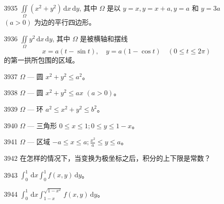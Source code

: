 \begin{prob}[M]{3935}
$\iint\limits_{\Omega} (x^2 + y^2)\,\mathrm{d}x\,\mathrm{d}y$, 其中 $\Omega$ 是以 $y = x, y = x + a, y = a$ 和 $y = 3a$ $(a > 0)$ 为边的平行四边形。
\end{prob}

\begin{prob}[M]{3936}
$\iint\limits_{\Omega} y^2\,\mathrm{d}x\,\mathrm{d}y$, 其中 $\Omega$ 是被横轴和摆线
\[
x = a(t - \sin t), \quad y = a(1 - \cos t) \quad (0 \leqslant t \leqslant 2\pi)
\]
的第一拱所包围的区域。
\end{prob}


\begin{prob}[S]{3937}
$\Omega$ — 圆 $x^2 + y^2 \leqslant a^2$。
\end{prob}

\begin{prob}[S]{3938}
$\Omega$ — 圆 $x^2 + y^2 \leqslant ax$ $(a > 0)$。
\end{prob}

\begin{prob}[S]{3939}
$\Omega$ — 环 $a^2 \leqslant x^2 + y^2 \leqslant b^2$。
\end{prob}

\begin{prob}[S]{3940}
$\Omega$ — 三角形 $0 \leqslant x \leqslant 1; 0 \leqslant y \leqslant 1 - x$。
\end{prob}

\begin{prob}[S]{3941}
$\Omega$ — 区域 $-a \leqslant x \leqslant a; \frac{x^2}{a} \leqslant y \leqslant a$。
\end{prob}

\begin{prob}[M]{3942}
在怎样的情况下，当变换为极坐标之后，积分的上下限是常数？
\end{prob}


\begin{prob}[S]{3943}
$\int_{0}^{1}\,\mathrm{d}x \int_{0}^{1} f(x, y)\,\mathrm{d}y$。
\end{prob}

\begin{prob}[S]{3944}
$\int_{0}^{1}\,\mathrm{d}x \int_{1 - x}^{\sqrt{1 - x^2}} f(x, y)\,\mathrm{d}y$。
\end{prob}

